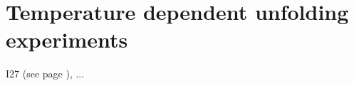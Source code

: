 \chapter{Temperature dependent unfolding experiments}
\label{sec:temperature}


I27 (see page \pageref{sec:I27}), ...

